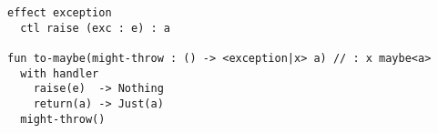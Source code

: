 \begin{algorithm}

\begin{verbatim}
effect exception
  ctl raise (exc : e) : a

fun to-maybe(might-throw : () -> <exception|x> a) // : x maybe<a>
  with handler
    raise(e)  -> Nothing
    return(a) -> Just(a)
  might-throw()
\end{verbatim}

\caption{Exception effect and handler in Koka %
\label{alg-eff:koka-exc}}
\end{algorithm}